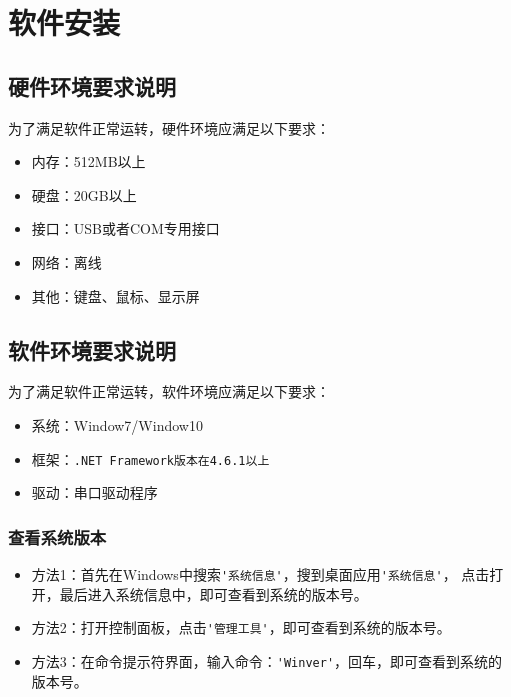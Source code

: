 \chapter{软件安装}
\section{硬件环境要求说明}
为了满足软件正常运转，硬件环境应满足以下要求：
\begin{itemize}
    \item  内存：512MB以上
    \item  硬盘：20GB以上
    \item  接口：USB或者COM专用接口
    \item  网络：离线
    \item  其他：键盘、鼠标、显示屏
\end{itemize}

\section{软件环境要求说明}
为了满足软件正常运转，软件环境应满足以下要求：
\begin{itemize}
    \item  系统：Window7/Window10
    \item  框架：\lstinline{.NET Framework版本在4.6.1以上}
    \item  驱动：串口驱动程序
\end{itemize}
\subsection{查看系统版本}
\begin{itemize}
    \item 方法1：首先在Windows中搜索\lstinline{'系统信息'}，搜到桌面应用\lstinline{'系统信息'}，
点击打开，最后进入系统信息中，即可查看到系统的版本号。
    \item 方法2：打开控制面板，点击\lstinline{'管理工具'}，即可查看到系统的版本号。
    \item 方法3：在命令提示符界面，输入命令：\lstinline{'Winver'}，回车，即可查看到系统的版本号。
\end{itemize}
